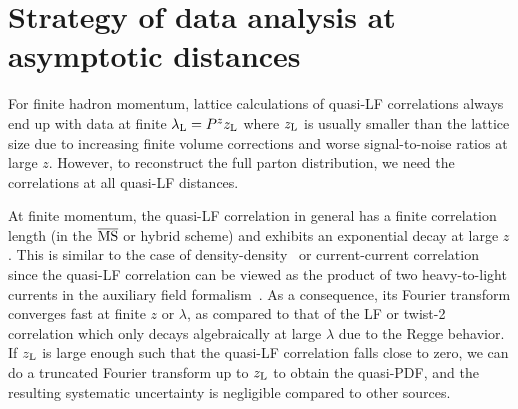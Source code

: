 \section{Strategy of data analysis at asymptotic distances}
\label{sec:regge}

For finite hadron momentum, lattice calculations of quasi-LF correlations always end up with data at
finite $\lambda_{\rm L}=P^zz_{\rm L}$ where $z_{\rm L}$ is usually smaller than the lattice size due to increasing finite volume corrections and worse signal-to-noise ratios at large $z$. However, to reconstruct the full parton distribution, we need the correlations at all quasi-LF distances.

At finite momentum, the quasi-LF correlation in general has a finite correlation length (in the ${\overline{\rm MS}}$ or hybrid scheme) and exhibits an exponential decay at large $z$. This is similar to the case of density-density~\cite{Burkardt:1994pw} or current-current correlation since the quasi-LF correlation can be viewed as the product of two heavy-to-light currents in the auxiliary field formalism~\cite{Samuel:1978iy,Gervais:1979fv,Arefeva:1980zd,Dorn:1986dt}. As a consequence, its Fourier transform converges fast at finite $z$ or $\lambda$, as compared to that of the LF or twist-2 correlation which only decays algebraically at large $\lambda$ due to the Regge behavior. If $z_{\rm L}$ is large enough such that the quasi-LF correlation falls close to zero, we can do a truncated Fourier transform up to $z_{\rm L}$ to obtain the quasi-PDF, and the resulting systematic uncertainty is negligible compared to other sources.

